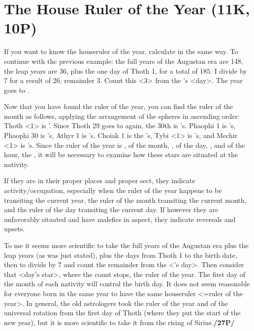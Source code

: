 \section{The House Ruler of the Year (11K, 10P)}

\mnm[0.3cm]
If you want to know the houseruler of the year, calculate in the same way. To continue with the previous example: the full years of the Augustan era are 148, the leap years are 36, plus the one day of Thoth 1, for a total of 185. I divide by 7 for a result of 26, remainder 3. Count this <3> from the \Sun’s
<day>. The year goes to \Mars. 

Now that you have found the ruler of the year, you can find the ruler of the month as follows, applying the arrangement of the spheres in ascending order: Thoth <1> is \Mars’. Since
Thoth 29 goes to \Mars\xspace again, the 30th is \Mercury’s. Phaophi 1 is \Jupiter’s, Phaophi 30 is \Venus’s, Athyr
1 is \Saturn’s, Choiak 1 is the \Moon’s, Tybi <1> is \Mercury’s, and Mechir <1> is \Venus’s. Since the
ruler of the year is \Mars, of the month, \Venus, of the day, \Mercury, and of the hour, the \Sun, it will be necessary to examine how these stars are situated at the nativity. 

\mndl[0.2cm]
If they are in their proper places and proper sect, they indicate activity/occupation, especially when the ruler of the year happens to be transiting the current year, the ruler of the month transiting the current month, and the ruler of the day transiting the current day. If however they are unfavorably situated and have malefics in aspect, they indicate reversals
and upsets.

To me it seems more scientific to take the full years of the Augustan era plus the leap years (as was just stated), plus the days from Thoth 1 to the birth date, then to divide by 7 and count the remainder from the \Sun<’s day>. Then consider that <day’s star>, where the count stops, the ruler of the year. The first day of the month of each nativity will control the birth day. It does not seem reasonable for everyone born in the same year to have the same houseruler <=ruler of the year>. In general, the old astrologers took the ruler of the year and of the universal rotation from the first day of Thoth (where they put the start of the new year), but it is more scientific to take it from the rising of Sirius.\textbf{/27P/}
\newpage